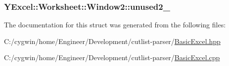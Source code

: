 \subsubsection[{unused2\+\_\+}]{ Y\+Excel\+::\+Worksheet\+::\+Window2\+::unused2\+\_\+}\label{struct_y_excel_1_1_worksheet_1_1_window2_af1aedfa4d819a2ba21b1e44f2146fbe1}


The documentation for this struct was generated from the following files\+:\begin{DoxyCompactItemize}
\item 
C\+:/cygwin/home/\+Engineer/\+Development/cutlist-\/parser/\hyperlink{_basic_excel_8hpp}{Basic\+Excel.\+hpp}\item 
C\+:/cygwin/home/\+Engineer/\+Development/cutlist-\/parser/\hyperlink{_basic_excel_8cpp}{Basic\+Excel.\+cpp}\end{DoxyCompactItemize}
